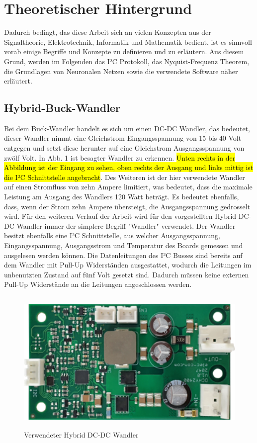 
\section{Theoretischer Hintergrund}
Dadurch bedingt, das diese Arbeit sich an vielen Konzepten aus der Signaltheorie, Elektrotechnik, Informatik und Mathematik bedient, ist es sinnvoll vorab einige Begriffe und Konzepte zu definieren und zu erläutern. Aus diesem Grund, werden im Folgenden das I²C Protokoll, das Nyquist-Frequenz Theorem, die Grundlagen von Neuronalen Netzen sowie die verwendete Software näher erläutert. 

\subsection{Hybrid-Buck-Wandler}
Bei dem Buck-Wandler handelt es sich um einen DC-DC Wandler, das bedeutet, dieser Wandler nimmt eine Gleichstrom Eingangsspannung von 15 bis 40 Volt entgegen und setzt diese herunter auf eine Gleichstrom Ausgangsspannung von zwölf Volt. In Abb. 1 ist besagter Wandler zu erkennen. \hl{Unten rechts in der Abbildung ist der Eingang zu sehen, oben rechts der Ausgang und links mittig ist die I²C Schnittstelle angebracht}. Des Weiteren ist der hier verwendete Wandler auf einen Stromfluss von zehn Ampere limitiert, was bedeutet, dass die maximale Leistung am Ausgang des Wandlers 120 Watt beträgt. Es bedeutet ebenfalls, dass, wenn der Strom zehn Ampere übersteigt, die Ausgangsspannung gedrosselt wird. Für den weiteren Verlauf der Arbeit wird für den vorgestellten Hybrid DC-DC Wandler immer der simplere Begriff "Wandler" verwendet.
Der Wandler besitzt ebenfalls eine I²C Schnittstelle, aus welcher Ausgangsspannung, Eingangsspannung, Ausgangsstrom und Temperatur des Boards gemessen und ausgelesen werden können. Die Datenleitungen des I²C Busses sind bereits auf dem Wandler mit Pull-Up Widerständen ausgestattet, wodurch die Leitungen im unbenutzten Zustand auf fünf Volt gesetzt sind. Dadurch müssen keine externen Pull-Up Widerstände an die Leitungen angeschlossen werden.

\begin{figure}[H]
    \centering
    \includegraphics[height= 7cm, width = \textwidth]{Pictures/Wandler.png}
    \caption{Verwendeter Hybrid DC-DC Wandler}
\end{figure}

